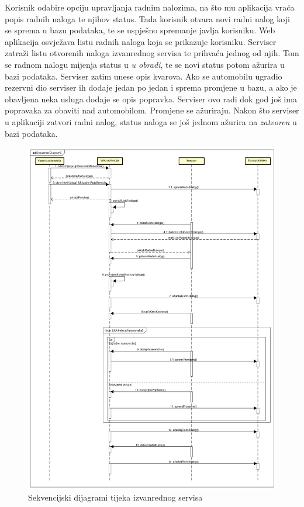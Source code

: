 \noindent Korisnik odabire opciju upravljanja radnim nalozima, na što mu aplikacija vraća popis radnih naloga te njihov status. Tada korisnik otvara novi radni nalog koji se sprema u bazu podataka, te se uspješno spremanje javlja korisniku. Web aplikacija osvježava listu radnih naloga koja se prikazuje korisniku. Serviser zatraži listu otvorenih naloga izvanrednog servisa te prihvaća jednog od njih. Tom se radnom nalogu mijenja status u \textit{u obradi}, te se novi status potom ažurira u bazi podataka. Serviser zatim unese opis kvarova. Ako se automobilu ugradio rezervni dio serviser ih dodaje jedan po jedan i sprema promjene u bazu, a ako je obavljena neka usluga dodaje se opis popravka. Serviser ovo radi dok god još ima popravaka za obaviti nad automobilom. Promjene se ažuriraju. Nakon što serviser u aplikaciji zatvori radni nalog, status naloga se još jednom ažurira na \textit{zatvoren} u bazi podataka.

	\begin{figure}[H]
		\centering
		\includegraphics[width=0.8\linewidth]{dijagrami/izvanredni-dijagram}
		\caption{Sekvencijski dijagrami tijeka izvanrednog servisa}
		\label{fig:izvanredni-dijagram}
	\end{figure}




